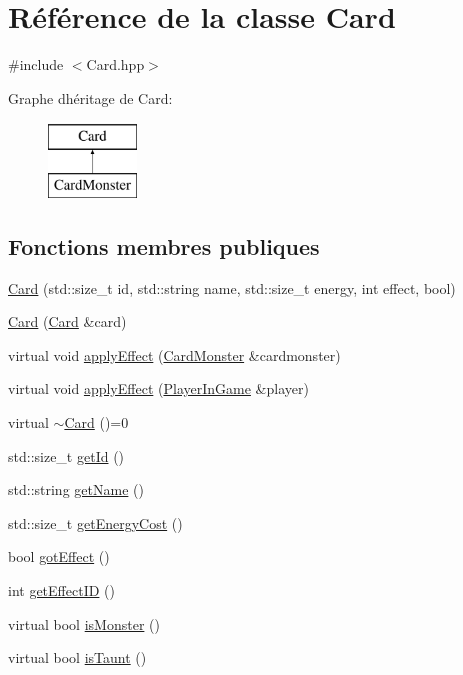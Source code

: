 \hypertarget{classCard}{}\section{Référence de la classe Card}
\label{classCard}


{\ttfamily \#include $<$Card.\+hpp$>$}

Graphe d\textquotesingle{}héritage de Card\+:\begin{figure}[H]
\begin{center}
\leavevmode
\includegraphics[height=2.000000cm]{classCard}
\end{center}
\end{figure}
\subsection*{Fonctions membres publiques}
\begin{DoxyCompactItemize}
\item 
\hyperlink{classCard_a5a1f6635176ec49f837327b1f849e979}{Card} (std\+::size\+\_\+t id, std\+::string name, std\+::size\+\_\+t energy, int effect, bool)
\item 
\hyperlink{classCard_a88211ebea56b896a7f43b8aa600cb74e}{Card} (\hyperlink{classCard}{Card} \&card)
\item 
virtual void \hyperlink{classCard_af0a0d8d7c477b09c5adecdd57db84c0c}{apply\+Effect} (\hyperlink{classCardMonster}{Card\+Monster} \&cardmonster)
\item 
virtual void \hyperlink{classCard_add526d506b074687e3940cda6d3e6d80}{apply\+Effect} (\hyperlink{classPlayerInGame}{Player\+In\+Game} \&player)
\item 
virtual \hyperlink{classCard_abf30649dca6b7398b7500e41fd6767e0}{$\sim$\+Card} ()=0
\item 
std\+::size\+\_\+t \hyperlink{classCard_a6eec742565ded028a7f2737c53ae4507}{get\+Id} ()
\item 
std\+::string \hyperlink{classCard_ad060fe107bfaf4741c671615885b314a}{get\+Name} ()
\item 
std\+::size\+\_\+t \hyperlink{classCard_a56f0050aa1cbc799b4481431163f5a90}{get\+Energy\+Cost} ()
\item 
bool \hyperlink{classCard_a9932401135454db169e1e4d678103917}{got\+Effect} ()
\item 
int \hyperlink{classCard_a6f6c3220c269eef98fe84ffbcffd9371}{get\+Effect\+I\+D} ()
\item 
virtual bool \hyperlink{classCard_a75c94d383b9710efb023de601b7103c5}{is\+Monster} ()
\item 
virtual bool \hyperlink{classCard_ae68d1105abd6827736e759add5c1651f}{is\+Taunt} ()
\end{DoxyCompactItemize}


